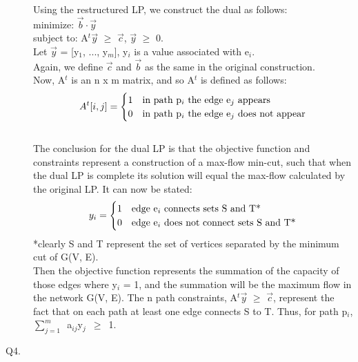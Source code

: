 \documentclass[10pt]{csc_assignment}
\begin{document}
\begin{description}
Using the restructured LP, we construct the dual as follows:\\
minimize: $\vec{b}\cdot\vec{y}$\\
subject to: A$^{t}$$\vec{y}$ $\geqslant$ $\vec{c}$, $\vec{y}$ $\geqslant$ 0.\\
Let $\vec{y}$ = [y$_{1}$, ..., y$_{m}$], y$_{i}$ is a value associated with e$_{i}$.\\ 
Again, we define $\vec{c}$ and $\vec{b}$ as the same in the original construction.\\
Now, A$^{t}$ is an n x m matrix, and so A$^{t}$ is defined as follows:\\
\[
A^{t}[i, j] = 
\begin{cases} 
      \hfill 1 \hfill & \text{in path p$_{i}$ the edge e$_{j}$ appears} \\
      \hfill 0 \hfill & \text{in path p$_{i}$ the edge e$_{j}$ does not appear} \\
  \end{cases}
\]\\
The conclusion for the dual LP is that the objective function and constraints 
represent a construction of a max-flow min-cut, such that when the dual LP
is complete its solution will equal the max-flow calculated by the original LP.
It can now be stated:
\[
y_{i} = 
\begin{cases} 
      \hfill 1 \hfill & \text{edge e$_{i}$ connects sets S and T*} \\
      \hfill 0 \hfill & \text{edge e$_{i}$ does not connect sets S and T*} \\
  \end{cases}
\]
\tiny{*clearly S and T represent the set of vertices separated by the minimum cut of G(V, E).}\\
\normalsize{
Then the objective function represents the summation of the capacity of those edges where y$_{i}$ = 1, and the summation will be the maximum flow in the network G(V, E). The n path constraints, A$^{t}$$\vec{y}$ $\geqslant$ $\vec{c}$, represent the fact that on each path at least one edge connects S to T. Thus, for path p$_{i}$, \mbox{$\sum_{j = 1}^{m}$ a$_{ij}$y$_{j}$ $\geqslant$ 1.}} 
  

\newpage
\item[Q4.]


\end{description}
\end{document}
